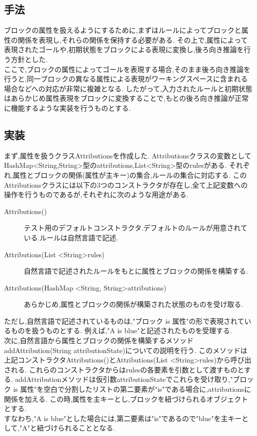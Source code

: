 \documentclass[uplatex,12pt]{jsarticle}
\begin{document}
\subsection{手法}
ブロックの属性を扱えるようにするために,まずはルールによってブロックと属性の関係を表現し,それらの関係を保持する必要がある.
その上で,属性によって表現されたゴールや,初期状態をブロックによる表現に変換し,後ろ向き推論を行う方針とした. \\
ここで,ブロックの属性によってゴールを表現する場合,そのまま後ろ向き推論を行うと,同一ブロックの異なる属性による表現がワーキングスペースに含まれる場合などへの対応が非常に複雑となる.
したがって,入力されたルールと初期状態はあらかじめ属性表現をブロックに変換することで,もとの後ろ向き推論が正常に機能するような実装を行うものとする.

\subsection{実装}
まず,属性を扱うクラスAttributionsを作成した.
Attributionsクラスの変数としてHashMap<String,String>型のattributions,List<String>型のrulesがある.
それぞれ,属性とブロックの関係(属性が主キー)の集合,ルールの集合に対応する.
このAttributionsクラスには以下の3つのコンストラクタが存在し,全て上記変数への操作を行うものであるが,それぞれに次のような用途がある.

\begin{description}
    \item[Attributions()] テスト用のデフォルトコンストラクタ.デフォルトのルールが用意されている.ルールは自然言語で記述.
    \item[Attributions(List \textless String\textgreater rules)] 自然言語で記述されたルールをもとに属性とブロックの関係を構築する.
    \item[Attributions(HashMap \textless String, String\textgreater attributions)] あらかじめ,属性とブロックの関係が構築された状態のものを受け取る.
\end{description}
ただし,自然言語で記述されているものは,"ブロック is 属性"の形で表現されているものを扱うものとする.
例えば,"A is blue"と記述されたものを受理する. \\

次に,自然言語から属性とブロックの関係を構築するメソッドaddAttribution(String attributionState)についての説明を行う.
このメソッドは上記コンストラクタAttributions()とAttributions(List \textless String\textgreater rules)から呼び出される.
これらのコンストラクタからはrulesの各要素を引数として渡すものとする.
addAttributionメソッドは仮引数attributionStateでこれらを受け取り,"ブロック is 属性"を空白で分割したリストの第二要素が"is"である場合に,attributionsに関係を加える.
この時,属性を主キーとし,ブロックを紐づけられるオブジェクトとする. \\
すなわち,"A is blue"とした場合には,第二要素は"is"であるので"blue"を主キーとして,"A"と紐づけられることとなる. \\
\end{document}
